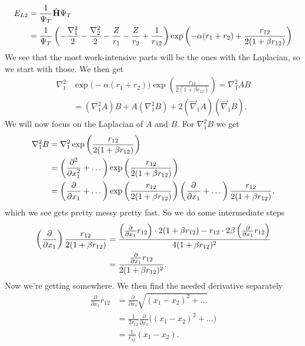 \begin{align*}
    E_{L2} &= \frac{1}{\Psi_T} \hat {\mathbf{H}} \Psi_T \notag\\
    &= \frac{1}{\Psi_T} \left( -\frac{\nabla_1^2}{2} - \frac{\nabla_2^2}{2} - \frac{Z}{r_1} - \frac{Z}{r_2} + \frac{1}{r_{12}} \right) \exp \left( -\alpha (r_1 + r_2) + \frac{r_{12}}{2(1+\beta r_{12})} \right)
\end{align*}
We see that the most work-intensive parts will be the ones with the Laplacian, so we start with those. We then get
\begin{align*}
	\nabla^2_1 &\exp \Big(-\alpha(r_1+r_2)\Big) \exp\left(\frac{r_{12}}{2(1 + \beta r_{12})}\right)
	= \nabla^2_1 AB \\
	&= (\nabla^2_1 A)B + A(\nabla^2_1 B) + 2(\vec\nabla_1 A)(\vec\nabla_1 B).
\end{align*}
We will now focus on the Laplacian of $A$ and $B$. For $\nabla^2_1 B$ we get
\begin{align}
	\nabla^2_1 B
	&= \nabla^2_1 \exp\left(\frac{r_{12}}{2(1 + \beta r_{12})}\right) \notag\\
	&= \left(\frac{\partial^2}{\partial x_1^2} + \dots \right) \exp\left(\frac{r_{12}}{2(1 + \beta r_{12})}\right) \notag\\
	&= \left(\frac{\partial}{\partial x_1} + \dots\right) \exp\left(\frac{r_{12}}{2(1 + \beta r_{12})}\right) \left(\frac{\partial}{\partial x_1} + \dots\right) \frac{r_{12}}{2(1 + \beta r_{12})},
	\label{eq:nabla2B}
\end{align}
which we see gets pretty messy pretty fast. So we do some intermediate steps
\begin{align}
	\left(\frac{\partial}{\partial x_1}\right) \frac{r_{12}}{2(1 + \beta r_{12})}
	&= \frac{ \left(\frac{\partial}{\partial x_1}r_{12}\right) \cdot 2(1+\beta r_{12}) - r_{12} \cdot 2\beta\left(\frac{\partial}{\partial x_1}r_{12}\right) } {4(1 + \beta r_{12})^2} \notag\\
	&= \frac{ \frac{\partial}{\partial x_1}r_{12} }{ 2(1 + \beta r_{12})^2 }.
	\label{eq:ddxfrac}
\end{align}
Now we're getting somewhere. We then find the needed derivative separately
\begin{align*}
	\frac{\partial}{\partial x_1}r_{12}
	&= \frac{\partial}{\partial x_1} \sqrt{(x_1 - x_2)^2 + \dots} \\
	&= \frac{1}{2r_{12}}\frac{\partial}{\partial x_1} \Big((x_1 - x_2)^2 + \dots\Big) \\
	&= \frac{1}{r_{12}}(x_1 - x_2).
\end{align*}
